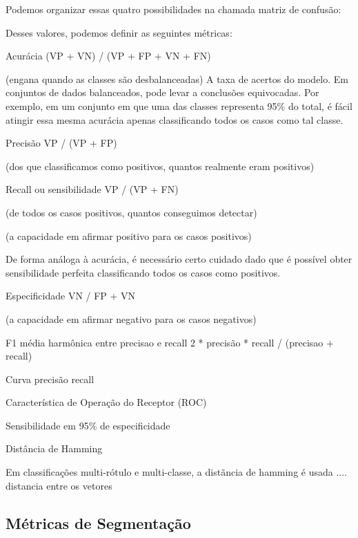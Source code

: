 \documentclass[12pt]{article}
\begin{document}
Podemos organizar essas quatro possibilidades na chamada matriz de confusão:


Desses valores, podemos definir as seguintes métricas:

Acurácia
(VP + VN) / (VP + FP + VN + FN)

(engana quando as classes são desbalanceadas)
A taxa de acertos do modelo. Em conjuntos de dados balanceados, pode levar a conclusões equivocadas. Por exemplo, em um conjunto em que uma das classes representa 95\% do total, é fácil atingir essa mesma acurácia apenas classificando todos os casos como tal classe.


Precisão
VP / (VP + FP)



(dos que classificamos como positivos, quantos realmente eram positivos)

Recall ou sensibilidade
VP / (VP + FN)

(de todos os casos positivos, quantos conseguimos detectar)

(a capacidade em afirmar positivo para os casos positivos)

De forma análoga à acurácia, é necessário certo cuidado dado que é possível obter sensibilidade perfeita classificando todos os casos como positivos.

Especificidade
VN / FP + VN

(a capacidade em afirmar negativo para os casos negativos)

F1
média harmônica entre precisao e recall
2 * precisão * recall / (precisao + recall)


Curva precisão recall

Característica de Operação do Receptor (ROC)

Sensibilidade em 95\% de especificidade




Distância de Hamming

Em classificações multi-rótulo e multi-classe, a distãncia de hamming é usada .... distancia entre os vetores

\subsection{Métricas de Segmentação}
\label{sec:metrics_segmentation}
\end{document}
